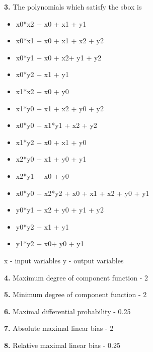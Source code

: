 \documentclass[journal=tosc,preprint]{iacrtrans}
\begin{document}
\noindent\textbf{3. } The polynomials which satisfy the sbox is
\begin{itemize}
	\item x0*x2 + x0 + x1 + y1
	\item x0*x1 + x0 + x1 + x2 + y2
	\item x0*y1 + x0 + x2+ y1 + y2
	\item x0*y2 + x1 + y1
	\item x1*x2 + x0 + y0
	\item x1*y0 + x1 + x2 + y0 + y2
	\item x0*y0 + x1*y1 + x2 + y2
	\item x1*y2 + x0 + x1 + y0
	\item x2*y0 + x1 + y0 + y1
	\item x2*y1 + x0 + y0
	\item x0*y0 + x2*y2 + x0 + x1 + x2 + y0 + y1
	\item y0*y1 + x2 + y0 + y1 + y2
	\item y0*y2 + x1 + y1
	\item y1*y2 + x0+ y0 + y1
\end{itemize}
\hspace{0.5cm} x - input variables y - output variables \newline

\noindent\textbf{4.} Maximum degree of component function - 2\newline

\noindent\textbf{5.} Minimum degree of component function - 2\newline

\noindent\textbf{6.} Maximal differential probability - 0.25\newline

\noindent\textbf{7.} Absolute maximal linear bias - 2\newline

\noindent\textbf{8.} Relative maximal linear bias - 0.25\newline


\end{document}
